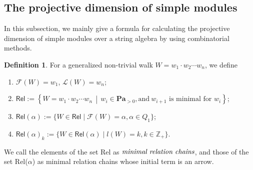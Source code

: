 \documentclass[11pt]{amsart}
\numberwithin{equation}{section}
\theoremstyle{definition}
\newtheorem{definition}[theorem]{Definition}
\begin{document}
\subsection{The projective dimension of simple modules }\label{subsection: The projective dimension of  simple modules}

In this subsection, we mainly give a formula for calculating the projective dimension of simple modules over a string algebra by using  combinatorial methods.

\begin{definition}\label{def:min-rel-chain}
	For a generalized non-trivial walk \( W = w_1 \cdot w_2 \cdots w_n \), we define
	\begin{enumerate}
		\item \( \mathscr{F}(W) = w_1 \), \( \mathscr{L}(W) = w_n \);
		\item \( \mathsf{Rel} := \left\{ W = w_1 \cdot w_2 \cdots w_n \,\middle|\, 
		w_i \in \textbf{Pa}_{>0}, \text{and}~w_{i + 1} \text{ is minimal for } w_i\right\} \);
		\item \( \mathsf{Rel}(\alpha) := \{ W \in \mathsf{Rel} \mid \mathscr{F}(W) = \alpha, \alpha \in Q_{1} \} \);
		\item \( \mathsf{Rel}(\alpha)_k := \{ W \in \mathsf{Rel}(\alpha) \mid l(W) = k,  k \in \mathbb{Z_{+}} \} \).
	\end{enumerate}
	We call the elements of the set Rel as $\emph{minimal relation chains}$, and those of the set Rel($\alpha$) as minimal relation chains whose initial term is an arrow.
\end{definition}
\end{document}
